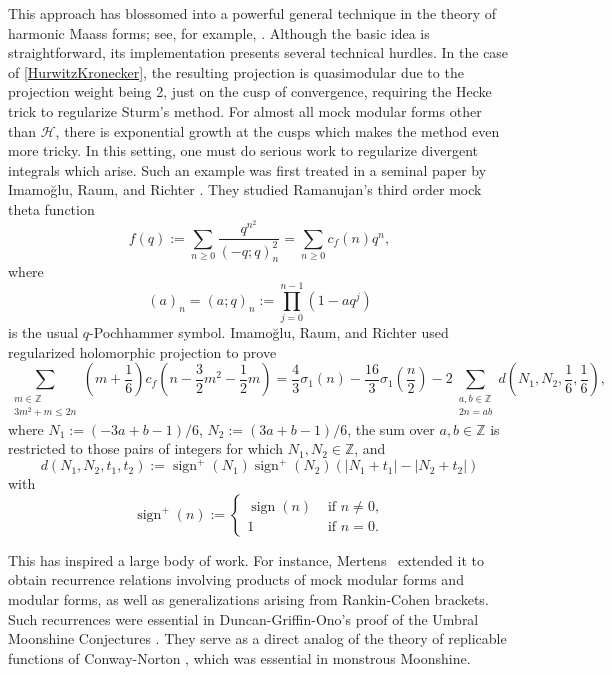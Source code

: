 \documentclass[11pt,reqno]{amsart}
\newcommand{\Z}{\mathbb{Z}}
\newcommand{\sign}{\operatorname{sign}}
\renewcommand{\=}{\;=\;}
\theoremstyle{myremark}
\begin{document}
This approach has blossomed into a powerful general technique in the theory of harmonic Maass forms; see, for example, \cite{ARZ,DMZ,MMR,Mertens384,MOR}.
Although the basic idea is straightforward, its implementation presents several technical hurdles.
In the case of \eqref{HurwitzKronecker}, the resulting projection is quasimodular due to the projection weight being 2, just on the cusp of convergence, requiring the Hecke trick to regularize Sturm's method.
For almost all mock modular forms other than $\mathcal H$, there is exponential growth at the cusps which makes the method even more tricky.
In this setting, one must do serious work to regularize divergent integrals which arise. 
Such an example was first treated in a seminal paper by Imamo\u{g}lu, Raum, and Richter \cite{IRR}.
They studied Ramanujan's third order mock theta function 
\[
f(q):=\sum_{n\geq0}\frac{q^{n^2}}{(-q;q)_n^2}=\sum_{n\geq0}c_f(n)q^n,
\]
where 
\[
(a)_n=(a;q)_n:=\prod_{j=0}^{n-1}\left(1-aq^j\right)
\]
is the usual $q$-Pochhammer symbol. 
Imamo\u{g}lu, Raum, and Richter used regularized holomorphic projection to prove 
\[
\sum_{\substack{m\in\Z\\ 3m^2+m\leq2n}}\left(m+\frac16\right)c_f\left(n-\frac{3}2m^2-\frac{1}{2}m\right)=\frac43\sigma_1(n)-\frac{16}{3}\sigma_1\left(\frac{n}{2
}\right)-2\sum_{\substack{a, b\in\mathbb Z\\ 2n=ab}}d\left(N_1, N_2, \frac16, \frac16\right)
,
\]
where $N_1:=(-3a+b-1)/6$, $N_2:=(3a+b-1)/6$, the sum over $a, b\in \mathbb Z$ is restricted to those pairs of integers for which $N_1, N_2\in\mathbb Z$, and 
\[
d(N_1, N_2, t_1, t_2) := \sign^+(N_1)\sign^+(N_2)\left(|N_1 + t_1| - |N_2 + t_2|\right)
\]
with 
\[
\sign^+(n):=\begin{cases} \sign(n) & \text{ if } n\neq0,\\ 1 & \text{ if } n=0.\end{cases}
\]

This has inspired a large body of work. 
For instance, Mertens~\cite{Mertens384} extended it to obtain recurrence relations involving products of mock modular forms and modular forms, as well as generalizations arising from Rankin-Cohen brackets.
Such recurrences were essential in Duncan-Griffin-Ono's proof of the Umbral Moonshine Conjectures \cite{UmbralMoonshine}. 
They serve as a direct analog of the theory of replicable functions of Conway-Norton \cite{ConwayNorton}, which was essential in monstrous Moonshine. 
\end{document}
